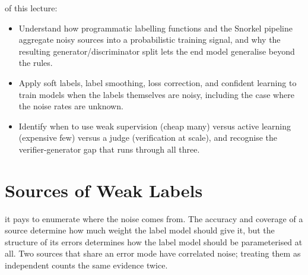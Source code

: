  of this lecture:
\begin{itemize}
    \item Understand how programmatic labelling functions and the Snorkel pipeline aggregate noisy sources into a probabilistic training signal, and why the resulting generator/discriminator split lets the end model generalise beyond the rules.
    \item Apply soft labels, label smoothing, loss correction, and confident learning to train models when the labels themselves are noisy, including the case where the noise rates are unknown.
    \item Identify when to use weak supervision (cheap many) versus active learning (expensive few) versus a judge (verification at scale), and recognise the verifier-generator gap that runs through all three.
\end{itemize}



\newpage
\section{Sources of Weak Labels}


 it pays to enumerate where the noise comes from. The accuracy and coverage of a source determine how much weight the label model should give it, but the structure of its errors determines how the label model should be parameterised at all. Two sources that share an error mode have correlated noise; treating them as independent counts the same evidence twice.

